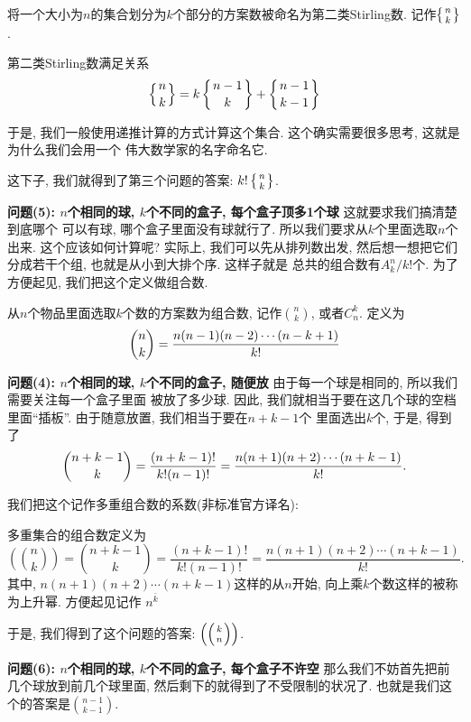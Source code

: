 \begin{definition}[第二类Stirling数]
    将一个大小为$n$的集合划分为$k$个部分的方案数被命名为第二类Stirling数. 记作$\left\{{n \atop k}\right\}$.
\end{definition}

\begin{theorem}
    第二类Stirling数满足关系
    $$
        \left\{{n \atop k}\right\}=k\left\{{n-1 \atop k}\right\}+\left\{{n-1 \atop k-1}\right\}
    $$
\end{theorem}

于是, 我们一般使用递推计算的方式计算这个集合. 这个确实需要很多思考, 这就是为什么我们会用一个
伟大数学家的名字命名它.

这下子, 我们就得到了第三个问题的答案: $k! \left\{{n \atop k}\right\}$.

\textbf{问题(5): $n$个相同的球, $k$个不同的盒子, 每个盒子顶多1个球  } 这就要求我们搞清楚到底哪个
可以有球, 哪个盒子里面没有球就行了. 所以我们要求从$k$个里面选取$n$个出来. 这个应该如何计算呢?
实际上, 我们可以先从排列数出发, 然后想一想把它们分成若干个组, 也就是从小到大排个序. 这样子就是
总共的组合数有$A_k^n/k!$个. 为了方便起见, 我们把这个定义做组合数.

\begin{definition}[组合数]
    从$n$个物品里面选取$k$个数的方案数为组合数, 记作${n\choose k}$, 或者$C_n^k$. 定义为
    $$
        {n\choose k}={n(n-1)(n-2)\cdots(n-k+1)\over k!}
    $$
\end{definition}


\textbf{问题(4): $n$个相同的球, $k$个不同的盒子, 随便放  } 由于每一个球是相同的, 所以我们需要关注每一个盒子里面
被放了多少球. 因此, 我们就相当于要在这几个球的空档里面``插板''. 由于随意放置, 我们相当于要在$n+k-1$个
里面选出$k$个, 于是, 得到了
$$
    {n+k-1\choose k} = \frac{(n+k-1)!}{k!(n-1)!} = {n(n+1)(n+2)\cdots(n+k-1)\over k!}.
$$

我们把这个记作多重组合数的系数(非标准官方译名):

\begin{definition}[多重集合组合数]
    多重集合的组合数定义为
    $$
        \left(\binom nk\right)=\binom{n+k-1}k=\frac{(n+k-1)!}{k!\left(n-1\right)!}=\frac{n(n+1)(n+2)\cdots(n+k-1)}{k!}.
    $$
    其中, $n(n+1)(n+2)\cdots(n+k-1)$这样的从$n$开始, 向上乘$k$个数这样的被称为上升幂. 方便起见记作
    $n^{\bar k}$
\end{definition}
于是, 我们得到了这个问题的答案: $\left(\left({k \atop n}\right)\right)$.

\textbf{问题(6): $n$个相同的球, $k$个不同的盒子, 每个盒子不许空  } 那么我们不妨首先把前几个球放到前几个球里面,
然后剩下的就得到了不受限制的状况了. 也就是我们这个的答案是${n-1\choose k-1}. $

